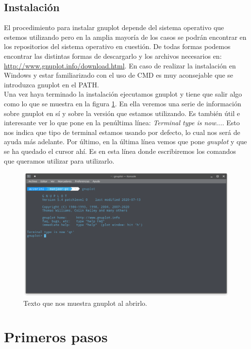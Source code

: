 \documentclass[11pt,a4paper,twoside,pdf]{article}
\numberwithin{equation}{section}
\begin{document}
\subsection{Instalación}

El procedimiento para instalar gnuplot depende del sistema operativo que estemos utilizando pero en la amplia mayoría de los casos se podrán encontrar en los repositorios del sistema operativo en cuestión. De todas formas podemos encontrar las distintas formas de descargarlo y los archivos necesarios en: \url{http://www.gnuplot.info/download.html}. En caso de realizar la instalación en Windows y estar familiarizado con el uso de CMD es muy aconsejable que se introduzca gnuplot en el PATH. \\

Una vez haya terminado la instalación ejecutamos gnuplot y tiene que salir algo como lo que se muestra en la figura \ref{fig:AbrirGnuplot}. En ella veremos una serie de información sobre gnuplot en sí y sobre la versión que estamos utilizando. Es también útil e interesante ver lo que pone en la penúltima línea: \textit{Terminal type is now...}. Esto nos indica que tipo de terminal estamos usando por defecto, lo cual nos será de ayuda más adelante. Por último, en la última línea vemos que pone \textit{gnuplot} y que se ha quedado el cursor ahí. Es en esta línea donde escribiremos los comandos que queramos utilizar para utilizarlo.

\begin{figure}
    \centering
    \includegraphics[scale=0.52]{Capturas/00_AbrirGnuplot.png}
    \caption{Texto que nos muestra gnuplot al abrirlo.}
    \label{fig:AbrirGnuplot}
\end{figure}
\newpage

\section{Primeros pasos}
\end{document}
